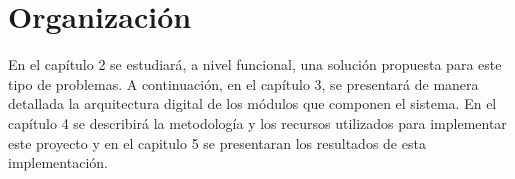 \section{Organización}

En el capítulo 2 se estudiará, a nivel funcional, una solución propuesta para este tipo de problemas. A continuación, en el capítulo 3, se presentará de manera detallada la arquitectura digital de los módulos que componen el sistema. En el capítulo 4 se describirá la metodología y los recursos utilizados para implementar este proyecto y en el capitulo 5 se presentaran los resultados de esta implementación.





